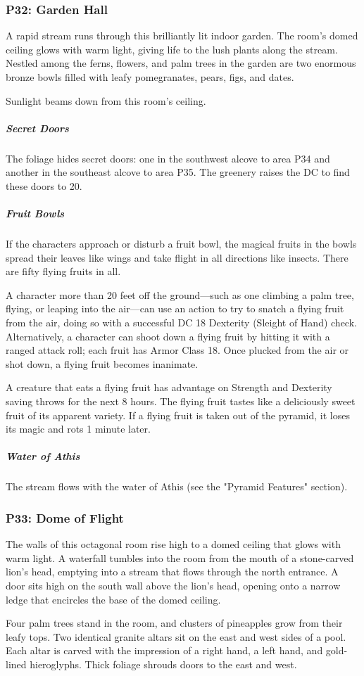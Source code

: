\documentclass[10pt,a4paper,twoside,bg=print,twocolumn,openany,nodeprecatedcode]{dndbook}
\begin{document}
\subsubsection{P32: Garden Hall}
\begin{DndReadAloud}{}
A rapid stream runs through this brilliantly lit indoor garden. The room's domed ceiling glows with warm light, giving life to the lush plants along the stream. Nestled among the ferns, flowers, and palm trees in the garden are two enormous bronze bowls filled with leafy pomegranates, pears, figs, and dates.

\end{DndReadAloud}

Sunlight beams down from this room's ceiling.

\subparagraph{Secret Doors}
The foliage hides secret doors: one in the southwest alcove to area P34 and another in the southeast alcove to area P35. The greenery raises the DC to find these doors to 20.

\subparagraph{Fruit Bowls}
If the characters approach or disturb a fruit bowl, the magical fruits in the bowls spread their leaves like wings and take flight in all directions like insects. There are fifty flying fruits in all.

A character more than 20 feet off the ground—such as one climbing a palm tree, flying, or leaping into the air—can use an action to try to snatch a flying fruit from the air, doing so with a successful DC 18 Dexterity (Sleight of Hand) check. Alternatively, a character can shoot down a flying fruit by hitting it with a ranged attack roll; each fruit has Armor Class 18. Once plucked from the air or shot down, a flying fruit becomes inanimate.

A creature that eats a flying fruit has advantage on Strength and Dexterity saving throws for the next 8 hours. The flying fruit tastes like a deliciously sweet fruit of its apparent variety. If a flying fruit is taken out of the pyramid, it loses its magic and rots 1 minute later.

\subparagraph{Water of Athis}
The stream flows with the water of Athis (see the "Pyramid Features" section).

\subsubsection{P33: Dome of Flight}
\begin{DndReadAloud}{}
The walls of this octagonal room rise high to a domed ceiling that glows with warm light. A waterfall tumbles into the room from the mouth of a stone-carved lion's head, emptying into a stream that flows through the north entrance. A door sits high on the south wall above the lion's head, opening onto a narrow ledge that encircles the base of the domed ceiling.

Four palm trees stand in the room, and clusters of pineapples grow from their leafy tops. Two identical granite altars sit on the east and west sides of a pool. Each altar is carved with the impression of a right hand, a left hand, and gold-lined hieroglyphs. Thick foliage shrouds doors to the east and west.

\end{DndReadAloud}
\end{document}

